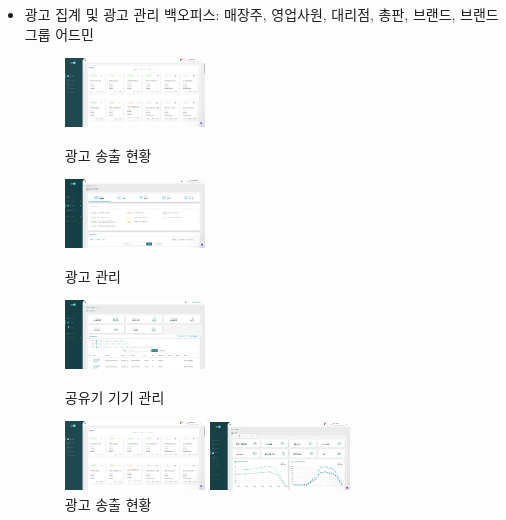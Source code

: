 \begin{itemize}[label=]
\begin{itemize}[label=]
		      \item 광고 집계 및 광고 관리 백오피스: 매장주, 영업사원, 대리점, 총판, 브랜드, 브랜드그룹 어드민
		            \begin{figure}[!ht]
			            \begin{fullwidth}
				            \parbox{0.35\textwidth}{
					            \centering
					            \includegraphics[width=0.35\textwidth]{images/ad-fi-admin-ad-dashboard.png}
					            \caption*{광고 송출 현황}
				            }\qquad
				            \parbox{0.35\textwidth}{
					            \centering
					            \includegraphics[width=0.35\textwidth]{images/ad-fi-admin-ad-manage.png}
					            \caption*{광고 관리}
				            }\qquad
				            \parbox{0.35\textwidth}{
					            \centering
					            \includegraphics[width=0.35\textwidth]{images/ad-fi-admin-device-manage.png}
					            \caption*{공유기 기기 관리}
				            }\qquad
				            \parbox{0.35\textwidth}{
					            \centering
					            \includegraphics[width=0.35\textwidth]{images/ad-fi-admin-ad-dashboard.png}
					            \caption*{광고 송출 현황}
				            }
				            \parbox{0.35\textwidth}{
					            \centering
					            \includegraphics[width=0.35\textwidth]{images/ad-fi-admin-dashboard.png}
}
\end{fullwidth}
\end{figure}
\end{itemize}
\end{itemize}
